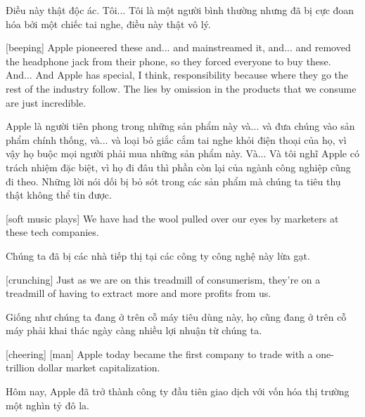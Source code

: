 \documentclass[a4paper]{article}
\begin{document}
	\begin{vietnamese-v2}
		Điều này thật độc ác.
		Tôi... Tôi là một người bình thường nhưng đã bị cực đoan hóa bởi một chiếc tai nghe, điều này thật vô lý.
	\end{vietnamese-v2}
	
	
	[beeping]
	Apple pioneered these and... and mainstreamed it, and... and removed the headphone jack from their phone, so they forced everyone to buy these.
	And... And Apple has special, I think, responsibility because where they go the rest of the industry follow.
	The lies by omission in the products that we consume are just incredible.
	
	\begin{vietnamese-v2}
		[bíp]
		Apple là người tiên phong trong những sản phẩm này và... và đưa chúng vào sản phẩm chính thống, và... và loại bỏ giắc cắm tai nghe khỏi điện thoại của họ, vì vậy họ buộc mọi người phải mua những sản phẩm này.
		Và... Và tôi nghĩ Apple có trách nhiệm đặc biệt, vì họ đi đâu thì phần còn lại của ngành công nghiệp cũng đi theo.
		Những lời nói dối bị bỏ sót trong các sản phẩm mà chúng ta tiêu thụ thật không thể tin được.
	\end{vietnamese-v2}
	
	[soft music plays]
	We have had the wool pulled over our eyes by marketers at these tech companies.
	
	\begin{vietnamese-v2}
		Chúng ta đã bị các nhà tiếp thị tại các công ty công nghệ này lừa gạt.
	\end{vietnamese-v2}
	
	[crunching]
	Just as we are on this treadmill of consumerism, they're on a treadmill of having to extract more and more profits from us.
	
	\begin{vietnamese-v2}
		Giống như chúng ta đang ở trên cỗ máy tiêu dùng này, họ cũng đang ở trên cỗ máy phải khai thác ngày càng nhiều lợi nhuận từ chúng ta.
	\end{vietnamese-v2}
	
	[cheering]
	[man] Apple today became the first company to trade with a one-trillion dollar market capitalization.
	
	\begin{vietnamese-v2}
		 Hôm nay, Apple đã trở thành công ty đầu tiên giao dịch với vốn hóa thị trường một nghìn tỷ đô la.
	\end{vietnamese-v2}
	
\end{document}
